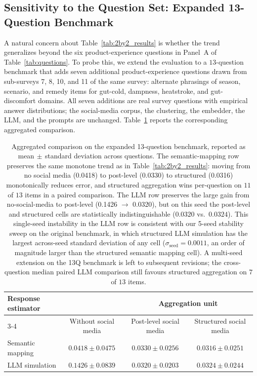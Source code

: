 \documentclass{article}
\begin{document}
\subsection{Sensitivity to the Question Set: Expanded 13-Question Benchmark}
\label{sec:expanded_13q}

A natural concern about Table~\ref{tab:2by2_results} is whether the trend
generalizes beyond the six product-experience questions in Panel~A of
Table~\ref{tab:questions}. To probe this, we extend the evaluation to a
$13$-question benchmark that adds seven additional product-experience
questions drawn from sub-surveys 7, 8, 10, and 11 of the same survey: alternate
phrasings of season, scenario, and remedy items for gut-cold, dampness,
heatstroke, and gut-discomfort domains. All seven additions are real survey
questions with empirical answer distributions; the social-media corpus, the
clustering, the embedder, the LLM, and the prompts are unchanged.
Table~\ref{tab:2by2_13q} reports the corresponding aggregated comparison.

\begin{table}[htb!]
\centering
\small
\begin{tabular}{lccc}
\toprule
\multirow{2}{*}{Response estimator} &
& \multicolumn{2}{c}{Aggregation unit} \\
\cmidrule(lr){3-4}
& Without social media & Post-level social media & Structured social media \\
\midrule
Semantic mapping & $0.0418 \pm 0.0475$ & $0.0330 \pm 0.0256$ & $\mathbf{0.0316 \pm 0.0251}$ \\
LLM simulation   & $0.1426 \pm 0.0839$ & $0.0320 \pm 0.0203$ & $0.0324 \pm 0.0244$ \\
\bottomrule
\end{tabular}
\caption{Aggregated comparison on the expanded 13-question benchmark, reported
as mean$\,\pm\,$standard deviation across questions. The semantic-mapping row
preserves the same monotone trend as in Table~\ref{tab:2by2_results}: moving
from no social media (0.0418) to post-level (0.0330) to structured (0.0316)
monotonically reduces error, and structured aggregation wins per-question on
$11$ of $13$ items in a paired comparison. The LLM row preserves the large
gain from no-social-media to post-level (0.1426 $\to$ 0.0320), but on this
seed the post-level and structured cells are statistically indistinguishable
($0.0320$ vs.\ $0.0324$). This single-seed instability in the LLM row is
consistent with our 5-seed stability sweep on the original benchmark, in
which structured LLM simulation has the largest across-seed standard deviation
of any cell ($\sigma_\text{seed}=0.0011$, an order of magnitude larger than
the structured semantic mapping cell). A multi-seed extension on the 13Q
benchmark is left to subsequent revisions; the cross-question median paired
LLM comparison still favours structured aggregation on $7$ of $13$ items.}
\label{tab:2by2_13q}
\end{table}
\end{document}
